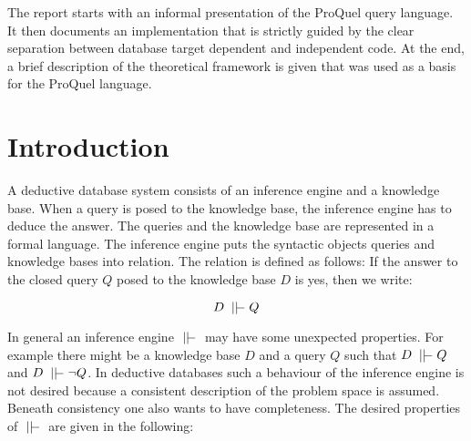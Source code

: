 The report starts with an informal presentation of the ProQuel query language. It 
then documents an implementation that is strictly guided by the clear separation between 
database target dependent and independent code. At the end, a brief description of the 
theoretical framework is given that was used as a basis for the ProQuel language. 

\newpage

\tableofcontents

\parindent0.0cm
\parskip0.2cm
\itemsep0.0cm 


\newcommand{\mysec}[1]{
\vspace{-0.4cm}
\section{#1}
\vspace{-0.2cm}}

\newcommand{\mychap}[1]{
\chapter{#1}
\vspace{-0.8cm}}

\mychap{Introduction}
A deductive database system consists of an inference engine and a knowledge base. When a query
is posed to the knowledge base, the inference engine has to deduce the answer. The queries and 
the knowledge base are represented in a formal language. The inference engine puts the syntactic 
objects queries and knowledge bases into relation. The relation is defined as follows: If the 
answer to the closed query $Q$ posed to the knowledge base $D$ is yes, then we write:

\begin{displaymath}
D \;\mid\mid\!\!\!-\; Q
\end{displaymath}

In general an inference engine $\;\mid\mid\!\!\!-\;$ may have some unexpected properties. For example there 
might be a knowledge base $D$ and a query $Q$ such that $D \;\mid\mid\!\!\!-\; Q$ 
and $D \;\mid\mid\!\!\!-\; \neg Q$. In deductive databases such a behaviour of the inference engine is not
desired because a consistent description of the problem space is assumed. Beneath consistency
one also wants to have completeness. The desired properties of $\;\mid\mid\!\!\!-\;$ are given in the 
following:

